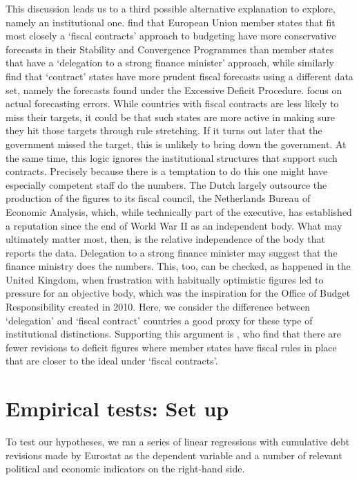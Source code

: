 \documentclass[]{article}
\begin{document}
This discussion leads us to a third possible alternative explanation to explore, namely an  institutional one. \cite{hallerbergstrauch2009} find that European Union member states that fit most closely a `fiscal contracts' approach to budgeting have more conservative forecasts in their Stability and Convergence Programmes than member states that have a `delegation to a strong finance minister' approach, while \cite{PinaVenes2011} similarly find that `contract' states have more prudent fiscal forecasts using a different data set, namely the forecasts found under the Excessive Deficit Procedure. \cite{hallerbergstrauch2009} focus on actual forecasting errors. While countries with fiscal contracts are less likely to miss their targets, it could be that such states are more active in making sure they hit those targets through rule stretching.  If it turns out later that the government missed the target, this is unlikely to bring down the government. At the same time, this logic ignores the institutional structures that support such contracts. Precisely because  there is a temptation to do this one might have especially competent staff do the numbers. The Dutch largely outsource the production of the figures to its fiscal council, the Netherlands Bureau of Economic Analysis, which, while technically part of the executive, has established a reputation since the end of World War II as an independent body. What may ultimately matter most, then, is the relative independence of the body that reports the data. Delegation to a strong finance minister may suggest that the finance ministry does the numbers. This, too, can be checked, as happened in the United Kingdom, when frustration with habitually optimistic figures led to pressure for an objective body, which was the inspiration for the Office of Budget Responsibility created in 2010. Here, we consider the difference between `delegation' and `fiscal contract' countries a good proxy for these type of institutional distinctions. Supporting this argument is \cite{DeCastro2013}, who find that there are fewer revisions to deficit figures where member states have fiscal rules in place that are closer to the ideal under `fiscal contracts'.

\section{Empirical tests: Set up}

To test our hypotheses, we ran a series of linear regressions with cumulative debt revisions made by Eurostat as the dependent variable and a number of relevant political and economic indicators on the right-hand side.
\end{document}
